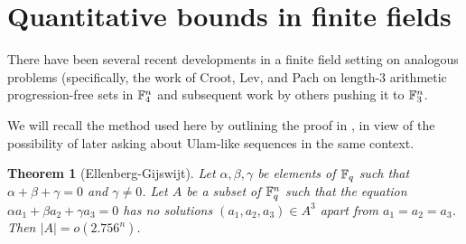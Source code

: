 \documentclass{report}
\newtheorem{theorem}{Theorem}[section]
\theoremstyle{remark}
\numberwithin{equation}{section}
\begin{document}
  


\section{Quantitative bounds in finite fields}

There have been several recent developments in a finite field setting
on analogous problems (specifically, the work of Croot, Lev, and Pach
\cite{croot:preprint} on length-3 arithmetic progression-free sets
in $\mathbb{F}_4^n$ and subsequent work by others \cite{ellenberg:preprint}
pushing it to $\mathbb{F}_3^n$.

We will recall the method used here by outlining the proof in
\cite{ellenberg:preprint}, in view of the possibility of later asking
about Ulam-like sequences in the same context.

\begin{theorem}[Ellenberg-Gijswijt]
Let $\alpha, \beta, \gamma$ be elements of $\mathbb{F}_q$ such that
$\alpha+\beta+\gamma = 0$ and $\gamma \neq 0$.  Let $A$ be a subset of
$\mathbb{F}_q^n$ such that the equation $\alpha a_1 + \beta a_2 + \gamma a_3
= 0$ has no solutions $(a_1, a_2, a_3) \in A^3$ apart from $a_1 = a_2
= a_3$.  Then $|A| = o(2.756^n)$.
\end{theorem}
\end{document}
